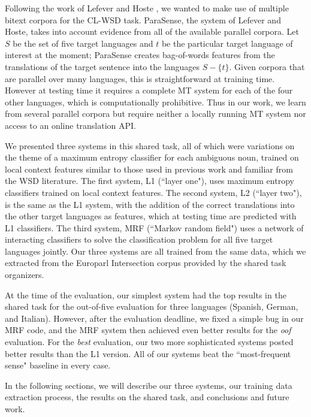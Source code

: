 \documentclass[11pt,letterpaper]{article}
\begin{document}
Following the work of Lefever and Hoste
, we wanted to make use of
multiple bitext corpora for the CL-WSD task.  ParaSense, the system of Lefever
and Hoste, takes into account evidence from all of the available parallel
corpora. Let $S$ be the set of five target languages and $t$ be the particular
target language of interest at the moment; ParaSense creates bag-of-words
features from the translations of the target sentence into the languages $S -
\lbrace{t \rbrace}$. Given corpora that are parallel over many languages, this
is straightforward at training time. However at testing time it requires a
complete MT system for each of the four other languages, which is
computationally prohibitive. Thus in our work, we learn from several parallel
corpora but require neither a locally running MT system nor access to an online
translation API.

We presented three systems in this shared task, all of which were variations on
the theme of a maximum entropy classifier for each ambiguous noun, trained on
local context features similar to those used in previous work and familiar from
the WSD literature. The first system, L1 (``layer one"), uses maximum entropy
classifiers trained on local context features. The second system, L2 (``layer
two"), is the same as the L1 system, with the addition of the correct
translations into the other target languages as features, which at testing time
are predicted with L1 classifiers. The third system, MRF (``Markov random
field") uses a network of interacting classifiers to solve the classification
problem for all five target languages jointly. Our three systems are all
trained from the same data, which we extracted from the Europarl Intersection
corpus provided by the shared task organizers.

At the time of the evaluation, our simplest system had the top results in the
shared task for the out-of-five evaluation for three languages (Spanish,
German, and Italian).  However, after the evaluation deadline, we fixed a
simple bug in our MRF code, and the MRF system then achieved even better
results for the \emph{oof} evaluation. For the \emph{best} evaluation, our two
more sophisticated systems posted better results than the L1 version. All of
our systems beat the ``most-frequent sense" baseline in every case.

In the following sections, we will describe our three systems, our training
data extraction process, the results on the shared task, and conclusions and
future work.
\end{document}
